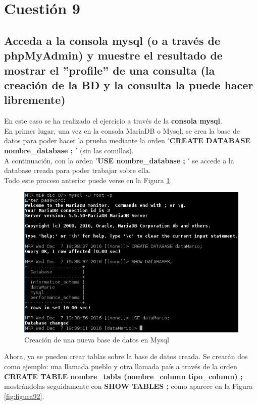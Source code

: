 \section{Cuestión 9}
\subsection{Acceda a la consola mysql (o a través de phpMyAdmin) y
	muestre el resultado de mostrar el ”profile” de una consulta (la creación de
	la BD y la consulta la puede hacer libremente)}

En este caso se ha realizado el ejercicio a través de la \textbf{consola mysql}.\\

En primer lugar, una vez en la consola MariaDB o Mysql, se crea la base de datos para poder hacer la prueba mediante la orden $ ' $\textbf{CREATE DATABASE nombre\_database ;} $ ' $ (sin las comillas).\\

A continuación, con la orden $ ' $\textbf{USE nombre\_database ;} $ ' $ se accede a la database creada para poder trabajar sobre ella. \\

Todo este proceso anterior puede verse en la Figura \ref{fig:figura91}.

\begin{figure}[H]
	\centering
	\includegraphics[scale=0.9]{figuras/ejercicio9/figura1.png} 
	\caption{Creación de una nueva base de datos en Mysql} 
	\label{fig:figura91}
\end{figure}

Ahora, ya se pueden crear tablas sobre la base de datos creada. Se crearán dos como ejemplo: una llamada pueblo y otra llamada país a través de la orden \textbf{CREATE TABLE nombre\_tabla (nombre\_column tipo\_column) ;} mostrándolas seguidamente con \textbf{SHOW TABLES ;} como aparece en la 
Figura \ref{fig:figura92}.

